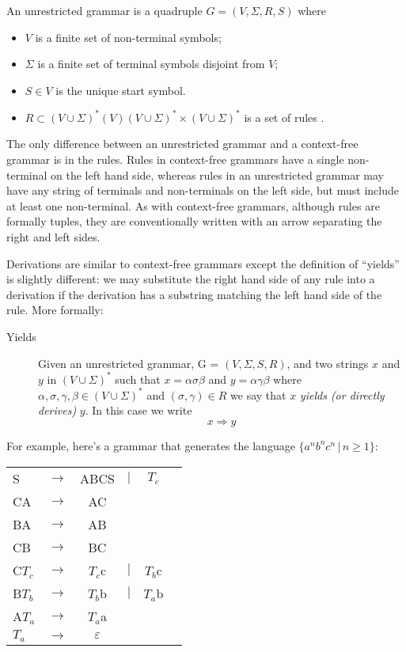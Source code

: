 
An unrestricted grammar is a quadruple $G=(V,\Sigma,R,S)$ where
\begin{itemize}
	\item $V$ is a finite set of non-terminal symbols;
	\item $\Sigma$ is a finite set of terminal symbols disjoint from $V$;
	\item $S \in V$ is the unique start symbol.
	\item $R \subset (V \cup \Sigma)^*(V)(V \cup \Sigma)^* \times (V \cup \Sigma)^*$ is a set of rules .
\end{itemize}
The only difference between an unrestricted grammar and a context-free grammar is in the rules.  Rules in context-free grammars have a single non-terminal on the left hand side, whereas rules in an unrestricted grammar may have any string of terminals and non-terminals on the left side, 
but must include at least one non-terminal. As with context-free grammars, although rules are formally
tuples, they are conventionally written with an arrow separating the right and left sides.

Derivations are similar to context-free grammars except the definition of ``yields'' is slightly different: 
we may substitute the right hand side of any rule into a derivation if the derivation has a substring matching the left hand side of the rule.  
More formally: \begin{description}
      \item[Yields]
      Given an unrestricted grammar, G = $(V , \Sigma , S, R)$, and two strings $x$ and $y$
      in $(V \cup \Sigma)^*$ such that $x = \alpha{}\sigma{}\beta$ and 
      $y = \alpha \gamma \beta$ where 
      $\alpha, \sigma, \gamma, \beta \in (V \cup \Sigma)^*$ and $( \sigma, \gamma) \in R$
      we say that $x$ {\em yields (or directly derives)} $y$.  In this case we write
       \[
         x \Longrightarrow y
       \]
 	\end{description}


For example, here's a grammar that generates the language $\{a^{n}b^{n}c^{n} \,|\, n \geq 1\}$:

\begin{center}
\begin{tabular}{llcccc}
S & $\rightarrow$ & ABCS & $|$ & $T_{c}$ \\
CA & $\rightarrow$ & AC \\
BA & $\rightarrow$ & AB \\
CB & $\rightarrow$ & BC \\
C$T_{c}$ & $\rightarrow$ & $T_{c}$c & $|$ & $T_{b}$c \\
B$T_{b}$ & $\rightarrow$ & $T_{b}$b & $|$ & $T_{a}$b \\
A$T_{a}$ & $\rightarrow$ & $T_{a}$a \\
$T_{a}$ & $\rightarrow$ & $\varepsilon$
\end{tabular}
\end{center}

